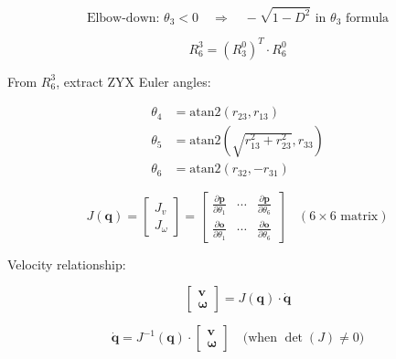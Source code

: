 \documentclass[border=10pt, convert={png300}]{standalone}
\begin{document}
\[
\text{Elbow-down: } \theta_3 < 0 \quad \Longrightarrow \quad -\sqrt{1-D^2} \text{ in } \theta_3 \text{ formula}
\]


\[
R^3_6 = (R^0_3)^T \cdot R^0_6
\]

\medskip

From $R^3_6$, extract ZYX Euler angles:

\[
\begin{aligned}
\theta_4 &= \text{atan2}(r_{23}, r_{13}) \\
\theta_5 &= \text{atan2}\left(\sqrt{r_{13}^2 + r_{23}^2}, r_{33}\right) \\
\theta_6 &= \text{atan2}(r_{32}, -r_{31})
\end{aligned}
\]


\[
J(\mathbf{q}) = 
\begin{bmatrix}
J_v \\
J_\omega
\end{bmatrix}
=
\begin{bmatrix}
\frac{\partial \mathbf{p}}{\partial \theta_1} & \cdots & \frac{\partial \mathbf{p}}{\partial \theta_6} \\
\frac{\partial \mathbf{o}}{\partial \theta_1} & \cdots & \frac{\partial \mathbf{o}}{\partial \theta_6}
\end{bmatrix}
\quad (6 \times 6 \text{ matrix})
\]

\bigskip

Velocity relationship:

\[
\begin{bmatrix} \mathbf{v} \\ \boldsymbol{\omega} \end{bmatrix}
= J(\mathbf{q}) \cdot \dot{\mathbf{q}}
\]

\bigskip

\[
\dot{\mathbf{q}} = J^{-1}(\mathbf{q}) \cdot \begin{bmatrix} \mathbf{v} \\ \boldsymbol{\omega} \end{bmatrix}
\quad \text{(when } \det(J) \neq 0 \text{)}
\]
\end{document}
